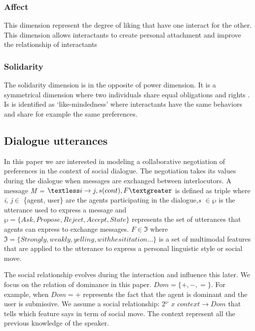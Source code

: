 \documentclass{llncs}
\begin{document}
\subsubsection{Affect}
This dimension represent the degree of liking that have one interact for the other. This dimension allows interactants to create personal attachment and improve the relationship of interactants \cite{nicholson2001role}
\subsubsection{Solidarity}
The solidarity dimension is in the opposite of power dimension. It is a symmetrical dimension where two individuals share equal obligations and rights \cite{svennevig2000getting}. Is is identified as ‘like-mindedness’ \cite{bickmore2005establishing} where interactants have the same behaviors and share for example the same preferences.
\subsection{Dialogue utterances}
In this paper we are interested in  modeling a collaborative negotiation of preferences in the context of social dialogue. The negotiation takes its values during the dialogue when messages are exchanged between interlocutors. A message \emph{M = $\textless i \rightarrow j, s(cont), F  \textgreater$} is defined as triple where \emph{i, j}$\in$ \{agent, user\} are the agents participating in the dialogue,\emph{s $\in \wp$}  is the utterance used to express a message and $\wp = \{ Ask, Propose, Reject, Accept, State\}$  represents the set of utterances that agents can express to exchange messages. 
 $F \in \Im $  where $\Im = \{ Strongly, weakly, yelling, with hesititation ...\}$ is a set of multimodal features that are applied to the utterance to express a personal linguistic style or social move.
 
 \par The social relationship evolves during the interaction and influence this later. We focus on the relation of dominance in this paper. $Dom = \{+, -, =\}$. For example, when $Dom = +$ represents the fact that the agent is dominant and the user is submissive. 
 We assume a social relationship: $2^\wp$ $x$  $context \rightarrow Dom $ that tells which feature says in term of social move. The context represent all the previous knowledge of the speaker. 
 
\end{document}
